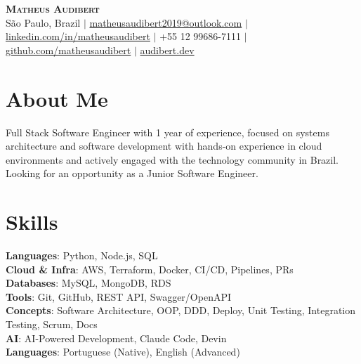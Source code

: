\documentclass[letterpaper,11pt]{article}
\begin{document}
\begin{center}
    {\Huge \scshape \textcolor{AccentColor}{\textbf{Matheus Audibert}}} \\ \vspace{1pt}
    \small
    São Paulo, Brazil $|$
    \href{mailto:matheusaudibert2019@outlook.com}{matheusaudibert2019@outlook.com} $|$
    \href{https://www.linkedin.com/in/matheusaudibert}{linkedin.com/in/matheusaudibert} $|$
    +55 12 99686-7111 $|$
    \href{https://github.com/matheusaudibert}{github.com/matheusaudibert} $|$
    \href{https://audibert.dev}{audibert.dev}
\end{center}

\section{About Me}
\begin{itemize}[leftmargin=0.15in, label={}]
\small{\item{
Full Stack Software Engineer with 1 year of experience, focused on systems architecture and software development with hands-on experience in cloud environments and actively engaged with the technology community in Brazil. Looking for an opportunity as a Junior Software Engineer.
}}
\end{itemize}

\section{Skills}
\begin{itemize}[leftmargin=0.15in, label={}]
\small{\item{
\textbf{Languages}: Python, Node.js, SQL \\
\textbf{Cloud \& Infra}: AWS, Terraform, Docker, CI/CD, Pipelines, PRs \\
\textbf{Databases}: MySQL, MongoDB, RDS \\
\textbf{Tools}: Git, GitHub, REST API, Swagger/OpenAPI \\
\textbf{Concepts}: Software Architecture, OOP, DDD, Deploy, Unit Testing, Integration Testing, Scrum, Docs \\
\textbf{AI}: AI-Powered Development, Claude Code, Devin \\
\textbf{Languages}: Portuguese (Native), English (Advanced)
}}
\end{itemize}

\end{document}
